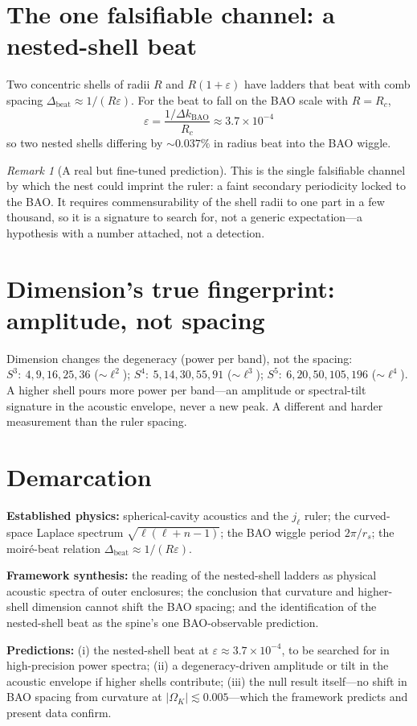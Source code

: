 \documentclass[11pt]{article}
\theoremstyle{remark}
\newtheorem{remark}[theorem]{Remark}
\newcommand{\OmK}{\Omega_K}
\begin{document}
\section{The one falsifiable channel: a nested-shell beat}
Two concentric shells of radii $R$ and $R(1+\varepsilon)$ have ladders that beat with comb spacing $\Delta_{\mathrm{beat}} \approx 1/(R\varepsilon)$. For the beat to fall on the BAO scale with $R = R_c$,
\begin{equation}
\boxed{\ \varepsilon = \frac{1/\Delta k_{\mathrm{BAO}}}{R_c} \approx 3.7\times10^{-4}\ }
\end{equation}
so two nested shells differing by $\sim 0.037\%$ in radius beat into the BAO wiggle.
\begin{remark}[A real but fine-tuned prediction]
This is the single falsifiable channel by which the nest could imprint the ruler: a faint secondary periodicity locked to the BAO. It requires commensurability of the shell radii to one part in a few thousand, so it is a signature to search for, not a generic expectation---a hypothesis with a number attached, not a detection.
\end{remark}
\section{Dimension's true fingerprint: amplitude, not spacing}
Dimension changes the degeneracy (power per band), not the spacing: $S^3:\ 4,9,16,25,36$ ($\sim \ell^2$); $S^4:\ 5,14,30,55,91$ ($\sim \ell^3$); $S^5:\ 6,20,50,105,196$ ($\sim \ell^4$). A higher shell pours more power per band---an amplitude or spectral-tilt signature in the acoustic envelope, never a new peak. A different and harder measurement than the ruler spacing.
\section{Demarcation}
\textbf{Established physics:} spherical-cavity acoustics and the $j_\ell$ ruler; the curved-space Laplace spectrum $\sqrt{\ell(\ell+n-1)}$; the BAO wiggle period $2\pi/r_s$; the moir\'e-beat relation $\Delta_{\mathrm{beat}} \approx 1/(R\varepsilon)$.

\textbf{Framework synthesis:} the reading of the nested-shell ladders as physical acoustic spectra of outer enclosures; the conclusion that curvature and higher-shell dimension cannot shift the BAO spacing; and the identification of the nested-shell beat as the spine's one BAO-observable prediction.

\textbf{Predictions:} (i) the nested-shell beat at $\varepsilon \approx 3.7\times10^{-4}$, to be searched for in high-precision power spectra; (ii) a degeneracy-driven amplitude or tilt in the acoustic envelope if higher shells contribute; (iii) the null result itself---no shift in BAO spacing from curvature at $|\OmK| \lesssim 0.005$---which the framework predicts and present data confirm.
\end{document}
